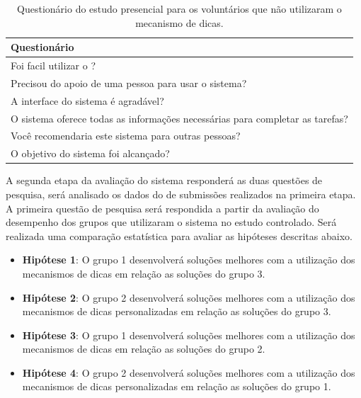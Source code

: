 \begin{table}[ht]
	\centering
	\captionsetup{justification=centering}
	\caption{Questionário do estudo presencial para os voluntários que não utilizaram o mecanismo de dicas.}
	\label{tabela:questionárioestudosemdica}
	\begin{tabular}{l}
		\hline
		Questionário                        											\\ \hline
		Foi facil utilizar o \foreign{iHint}?                            				\\
		Precisou do apoio de uma pessoa para usar o sistema?                           	\\
		A interface do sistema é agradável?                        						\\
		O sistema oferece todas as informações necessárias para completar as tarefas?   \\
		Você recomendaria este sistema para outras pessoas?                           	\\
		O objetivo do sistema foi alcançado? 											\\ \hline
	\end{tabular}
\end{table}

A segunda etapa da avaliação do sistema responderá as duas questões de pesquisa, será analisado os dados do  de submissões realizados na primeira etapa. A primeira questão de pesquisa será respondida a partir da avaliação do desempenho dos grupos que utilizaram o sistema no estudo controlado. Será realizada uma comparação estatística para avaliar as hipóteses descritas abaixo. 

\begin{itemize}
	\item \textbf{Hipótese 1}: O grupo 1 desenvolverá soluções melhores com a utilização dos mecanismos de dicas em relação as soluções do grupo 3.
	\item \textbf{Hipótese 2}: O grupo 2 desenvolverá soluções melhores com a utilização dos mecanismos de dicas personalizadas em relação as soluções do grupo 3.	
	\item \textbf{Hipótese 3}: O grupo 1 desenvolverá soluções melhores com a utilização dos mecanismos de dicas em relação as soluções do grupo 2.	
	\item \textbf{Hipótese 4}: O grupo 2 desenvolverá soluções melhores com a utilização dos mecanismos de dicas personalizadas em relação as soluções do grupo 1.
\end{itemize}

